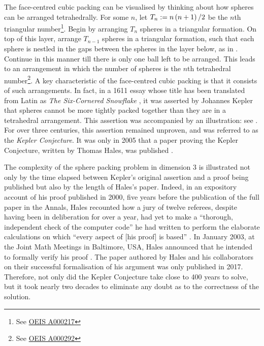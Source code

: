 The face-centred cubic packing can be visualised by thinking about how spheres can be arranged tetrahedrally. For some $n$, let $T_n := n\left( n + 1 \right)/2$ be the $n$th triangular number\footnote{See \href{https://oeis.org/A000217}{OEIS A000217}}. Begin by arranging $T_n$ spheres in a triangular formation. On top of this layer, arrange $T_{n - 1}$ spheres in a triangular formation, such that each sphere is nestled in the gaps between the spheres in the layer below, as in . Continue in this manner till there is only one ball left to be arranged. This leads to an arrangement in which the number of spheres is the $n$th tetrahedral number\footnote{See \href{https://oeis.org/A000292}{OEIS A000292}}. A key characteristic of the face-centred cubic packing is that it consists of such arrangements. In fact, in a 1611 essay whose title has been translated from Latin as \textit{The Six-Cornered Snowflake} \cite{KeplerSnowflake}, it was asserted by Johannes Kepler that spheres cannot be more tightly packed together than they are in a tetrahedral arrangement. This assertion was accompanied by an illustration: see . For over three centuries, this assertion remained unproven, and was referred to as the \textit{Kepler Conjecture}. It was only in 2005 that a paper proving the Kepler Conjecture, written by Thomas Hales, was published \cite{HalesKeplerInformal}.

The complexity of the sphere packing problem in dimension $3$ is illustrated not only by the time elapsed between Kepler's original assertion and a proof being published but also by the length of Hales's paper. Indeed, in an expository account of his proof published in 2000, five years before the publication of the full paper in the Annals, Hales recounted how a jury of twelve referees, despite having been in deliberation for over a year, had yet to make a ``thorough, independent check of the computer code'' he had written to perform the elaborate calculations on which ``every aspect of [his proof] is based'' \cite{CannonHoney}. In January 2003, at the Joint Math Meetings in Baltimore, USA, Hales announced that he intended to formally verify his proof \cite{HalesKeplerFormal}. The paper authored by Hales and his collaborators on their successful formalisation of his argument was only published in 2017. Therefore, not only did the Kepler Conjecture take close to 400 years to solve, but it took nearly two decades to eliminate any doubt as to the correctness of the solution.

